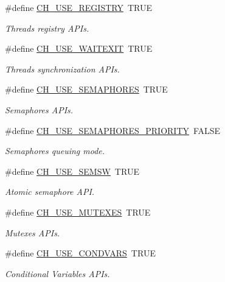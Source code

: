 \begin{DoxyCompactItemize}
\item 
\#define \hyperlink{group__config_ga881045654c5c0b04081bf89da3fe4534}{C\+H\+\_\+\+U\+S\+E\+\_\+\+R\+E\+G\+I\+S\+T\+R\+Y}~T\+R\+U\+E
\begin{DoxyCompactList}\small\item\em Threads registry A\+P\+Is. \end{DoxyCompactList}\item 
\#define \hyperlink{group__config_gac5e6308f66b8fdb57f0c849ed22b3d95}{C\+H\+\_\+\+U\+S\+E\+\_\+\+W\+A\+I\+T\+E\+X\+I\+T}~T\+R\+U\+E
\begin{DoxyCompactList}\small\item\em Threads synchronization A\+P\+Is. \end{DoxyCompactList}\item 
\#define \hyperlink{group__config_gab88f410fdc6a67192194a8431d991b27}{C\+H\+\_\+\+U\+S\+E\+\_\+\+S\+E\+M\+A\+P\+H\+O\+R\+E\+S}~T\+R\+U\+E
\begin{DoxyCompactList}\small\item\em Semaphores A\+P\+Is. \end{DoxyCompactList}\item 
\#define \hyperlink{group__config_ga866568c0387963f11c078a8d939c2284}{C\+H\+\_\+\+U\+S\+E\+\_\+\+S\+E\+M\+A\+P\+H\+O\+R\+E\+S\+\_\+\+P\+R\+I\+O\+R\+I\+T\+Y}~F\+A\+L\+S\+E
\begin{DoxyCompactList}\small\item\em Semaphores queuing mode. \end{DoxyCompactList}\item 
\#define \hyperlink{group__config_gae9e6ff0fe1964761ea6e1bce51d8ee59}{C\+H\+\_\+\+U\+S\+E\+\_\+\+S\+E\+M\+S\+W}~T\+R\+U\+E
\begin{DoxyCompactList}\small\item\em Atomic semaphore A\+P\+I. \end{DoxyCompactList}\item 
\#define \hyperlink{group__config_ga4f461a7b5edbff2405b7b40d2bb238a6}{C\+H\+\_\+\+U\+S\+E\+\_\+\+M\+U\+T\+E\+X\+E\+S}~T\+R\+U\+E
\begin{DoxyCompactList}\small\item\em Mutexes A\+P\+Is. \end{DoxyCompactList}\item 
\#define \hyperlink{group__config_ga24fd7fe539fd6094b5db3215e1721c9c}{C\+H\+\_\+\+U\+S\+E\+\_\+\+C\+O\+N\+D\+V\+A\+R\+S}~T\+R\+U\+E
\begin{DoxyCompactList}\small\item\em Conditional Variables A\+P\+Is. \end{DoxyCompactList}\item 

\end{DoxyCompactItemize}
